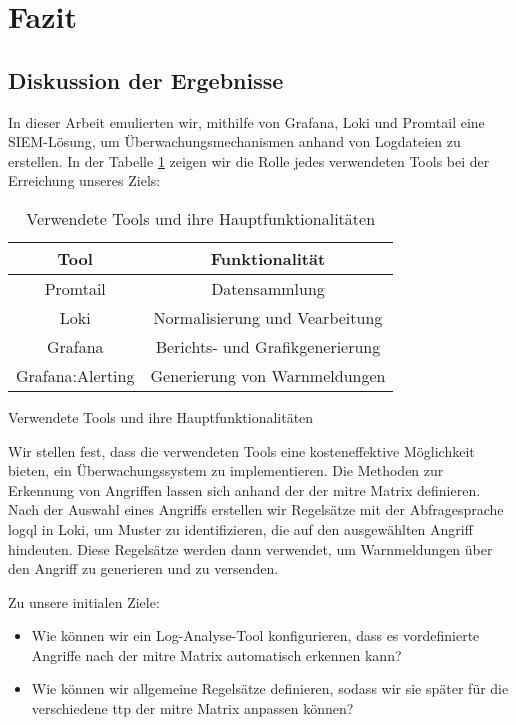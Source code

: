 \section{Fazit}

\subsection{Diskussion der Ergebnisse}
In dieser Arbeit emulierten wir, mithilfe von Grafana, Loki und Promtail eine \gls{SIEM}-Lösung, um Überwachungsmechanismen anhand von Logdateien zu erstellen. In der Tabelle \ref{tab:VerewendeteTools} zeigen wir die Rolle jedes verwendeten Tools bei der Erreichung unseres Ziels:

\begin{table}[h]
    \centering
    \begin{tabular}{|c|c|}
    \hline
    \textbf{Tool}    & \textbf{Funktionalität}         \\ \hline
    Promtail         & Datensammlung                   \\ \hline
    Loki             & Normalisierung und Vearbeitung  \\ \hline
    Grafana          & Berichts- und Grafikgenerierung \\ \hline
    Grafana:Alerting & Generierung von Warnmeldungen   \\ \hline
    \end{tabular}
    \caption{Verwendete Tools und ihre Hauptfunktionalitäten} 
    {Verwendete Tools und ihre Hauptfunktionalitäten}
    \label{tab:VerewendeteTools}
\end{table}

Wir stellen fest, dass die verwendeten Tools eine kosteneffektive Möglichkeit bieten, ein Überwachungssystem zu implementieren. Die Methoden zur Erkennung von Angriffen lassen sich anhand der  der \gls{mitre} Matrix definieren. Nach der Auswahl eines Angriffs erstellen wir Regelsätze mit der Abfragesprache \gls{logql} in Loki, um Muster zu identifizieren, die auf den ausgewählten Angriff hindeuten. Diese Regelsätze werden dann verwendet, um Warnmeldungen über den Angriff zu generieren und zu versenden.

Zu unsere initialen Ziele:

{
\begin{itemize}[noitemsep]
   \item Wie können wir ein Log-Analyse-Tool konfigurieren, dass es vordefinierte Angriffe nach der \gls{mitre} Matrix automatisch erkennen kann? 
   \item Wie können wir allgemeine Regelsätze definieren, sodass wir sie später für die verschiedene \gls{ttp} der \gls{mitre} Matrix anpassen können?
\end{itemize}
}

